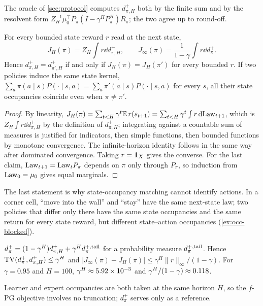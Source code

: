 The oracle of \cref{sec:protocol} computes $d^+_{\pi,H}$ both by the finite sum and by the resolvent form $Z_H^{-1}\mu_0^\top P_\pi(I-\gamma^HP_\pi^H)R_\pi$; the two agree up to round-off.

\begin{proposition}\label{prop:m-return}
For every bounded state reward $r$ read at the next state,
\[
J_H(\pi)=Z_H\int r\dd d^+_{\pi,H},\qquad J_\infty(\pi)=\frac1{1-\gamma}\int r\dd d^+_\pi .
\]
Hence $d^+_{\pi,H}=d^+_{\pi',H}$ if and only if $J_H(\pi)=J_H(\pi')$ for every bounded $r$.
If two policies induce the same state kernel, $\sum_a\pi(a\mid s)P(\cdot\mid s,a)=\sum_a\pi'(a\mid s)P(\cdot\mid s,a)$ for every $s$, all their state occupancies coincide even when $\pi\ne\pi'$.
\end{proposition}
\begin{proof}
By linearity, $J_H(\pi)=\sum_{t<H}\gamma^t\E\,r(s_{t+1})=\sum_{t<H}\gamma^t\int r\dd\law_{t+1}$, which is $Z_H\int r\dd d^+_{\pi,H}$ by the definition of $d^+_{\pi,H}$; integrating against a countable sum of measures is justified for indicators, then simple functions, then bounded functions by monotone convergence. The infinite-horizon identity follows in the same way after dominated convergence. Taking $r=\ind_X$ gives the converse. For the last claim, $\law_{t+1}=\law_tP_\pi$ depends on $\pi$ only through $P_\pi$, so induction from $\law_0=\mu_0$ gives equal marginals.
\end{proof}

The last statement is why state-occupancy matching cannot identify actions.
In a corner cell, ``move into the wall'' and ``stay'' have the same next-state law; two policies that differ only there have the same state occupancies and the same return for every state reward, but different state--action occupancies (\cref{ex:occ-blocked}).

\begin{proposition}\label{prop:m-tail}
$d^+_\pi=(1-\gamma^H)d^+_{\pi,H}+\gamma^Hd^{+,\tail}_\pi$ for a probability measure $d^{+,\tail}_\pi$. Hence $\TV(d^+_\pi,d^+_{\pi,H})\le\gamma^H$ and $\lvert J_\infty(\pi)-J_H(\pi)\rvert\le\gamma^H\lVert r\rVert_\infty/(1-\gamma)$.
For $\gamma=0.95$ and $H=100$, $\gamma^H\approx\vn{const.gH}{5.92\times10^{-3}}$ and $\gamma^H/(1-\gamma)\approx\vn{const.gH_over}{0.118}$.
\end{proposition}

Learner and expert occupancies are both taken at the same horizon $H$, so the $f$-PG objective involves no truncation; $d^+_\pi$ serves only as a reference.

